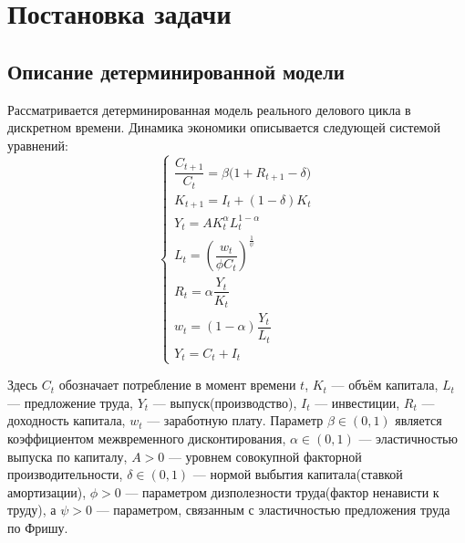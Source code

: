 \documentclass[12pt,a4paper]{report}   %
\begin{document}


    \chapter{Постановка задачи}
        \section{Описание детерминированной модели}
            Рассматривается детерминированная модель реального делового цикла в дискретном времени. Динамика экономики описывается следующей системой уравнений:
            \begin{equation}
            \begin{cases}
            \dfrac{C_{t+1}}{C_t} = \beta\bigl(1+R_{t+1} - \delta\bigr) \\[6pt]
            K_{t+1} = I_t + (1 - \delta)K_t \\[4pt]
            Y_t = A K_t^{\alpha} L_t^{1-\alpha} \\[4pt]
            L_t = \left(\dfrac{w_t}{\phi C_t}\right)^{\frac{1}{\psi}} \\[6pt]
            R_t = \alpha \dfrac{Y_t}{K_t}\\[6pt]
            w_t = (1-\alpha)\dfrac{Y_t}{L_t} \\[6pt]
            Y_t = C_t + I_t
            \end{cases}
            \end{equation}

            Здесь $C_t$ обозначает потребление в момент времени $t$, $K_t$ --- объём капитала, $L_t$ --- предложение труда, $Y_t$ --- выпуск(производство), $I_t$ --- инвестиции, $R_t$ --- доходность капитала, $w_t$ --- заработную плату. Параметр $\beta\in(0,1)$ является коэффициентом межвременного дисконтирования, $\alpha\in(0,1)$ --- эластичностью выпуска по капиталу, $A>0$ --- уровнем совокупной факторной производительности, $\delta\in(0,1)$ --- нормой выбытия капитала(ставкой амортизации), $\phi>0$ --- параметром дизполезности труда(фактор ненависти к труду), а $\psi>0$ --- параметром, связанным с эластичностью предложения труда по Фришу.
\end{document}
